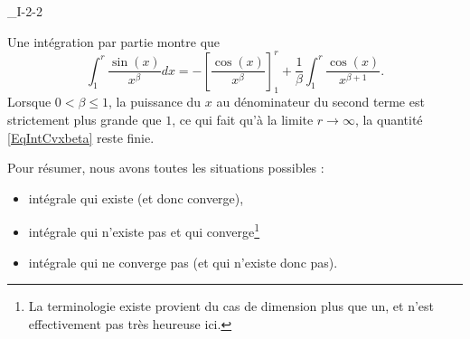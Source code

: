 \begin{corrige}{_I-2-2}
\begin{enumerate}
Une intégration par partie montre que
\begin{equation}		\label{EqIntCvxbeta}
	\int_1^r \frac{ \sin(x) }{ x^{\beta} }dx=-\left[ \frac{ \cos(x) }{ x^{\beta} } \right]^r_1+\frac{1}{ \beta }\int_1^r\frac{ \cos(x) }{ x^{\beta+1} }.
\end{equation}
Lorsque $0<\beta\leq 1$, la puissance du $x$ au dénominateur du second terme est strictement plus grande que $1$, ce qui fait qu'à la limite $r\to\infty$, la quantité \eqref{EqIntCvxbeta} reste finie.

\end{enumerate}
Pour résumer, nous avons toutes les situations possibles :
\begin{itemize}
\item intégrale qui existe (et donc converge),
\item intégrale qui n'existe pas et qui converge\footnote{La terminologie \og existe\fg{} provient du cas de dimension plus que un, et n'est effectivement pas très heureuse ici.}
\item intégrale qui ne converge pas (et qui n'existe donc pas).
\end{itemize}

\end{corrige}
